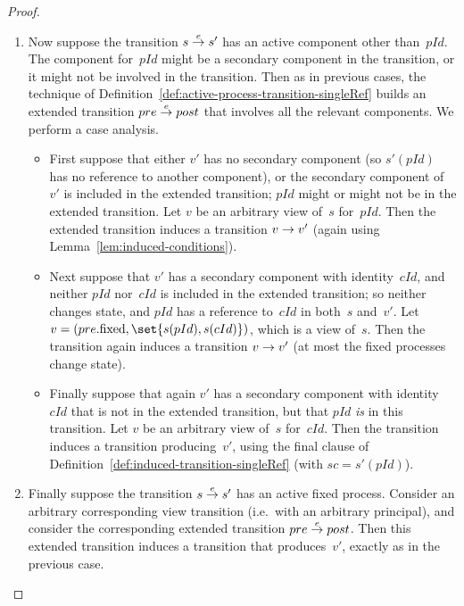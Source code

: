 \begin{proof}
\begin{enumerate}



\item %
Now suppose the transition $s \stackrel{e}\rightarrow s'$ has an active component other
than~$pId$.  The component for~$pId$ might be a secondary component in the
transition, or it might not be involved in the transition.  Then as in
previous cases, the technique of
Definition~\ref{def:active-process-transition-singleRef} builds an extended
transition \( pre \stackrel{e}\rightarrow post \) that involves all the relevant
components.  We perform a case analysis.
\begin{itemize}
\item First suppose that either $v'$ has no secondary component (so $s'(pId)$
  has no reference to another component), or the secondary component of~$v'$
  is included in the extended transition; $pId$ might or might not be in the
  extended transition.  Let $v$ be an arbitrary view of~$s$ for~$pId$.  Then
  the extended transition induces a transition $v \stackrel{}\rightarrow v'$ (again using
  Lemma~\ref{lem:induced-conditions}).

\item Next suppose that $v'$ has a secondary component with identity~$cId$,
  and neither $pId$ nor~$cId$ is included in the extended transition; so
  neither changes state, and $pId$ has a reference to~$cId$ in both~$s$
  and~$v'$.  Let $v = (pre.\fixed, \set{s(pId), s(cId)})$, which is a view
  of~$s$.  Then the transition again induces a transition $v \stackrel{}\rightarrow v'$ (at
  most the fixed processes change state).

\item Finally suppose that again $v'$ has a secondary component with
  identity~$cId$ that is not in the extended transition, but that $pId$
  \emph{is} in this transition.  Let $v$ be an arbitrary view of~$s$
  for~$cId$.  Then the transition induces a transition producing~$v'$, using
  the final clause of Definition~\ref{def:induced-transition-singleRef} (with
  $sc = s'(pId)$).
\end{itemize}

\item
Finally suppose the transition $s \stackrel{e}\rightarrow s'$ has an active fixed process.
Consider an arbitrary corresponding view transition (i.e.~with an arbitrary
principal), and consider the corresponding extended transition $pre \stackrel{e}\rightarrow
post$.  Then this extended transition induces a transition that produces~$v'$,
exactly as in the previous case.
\end{enumerate}

\end{proof}

